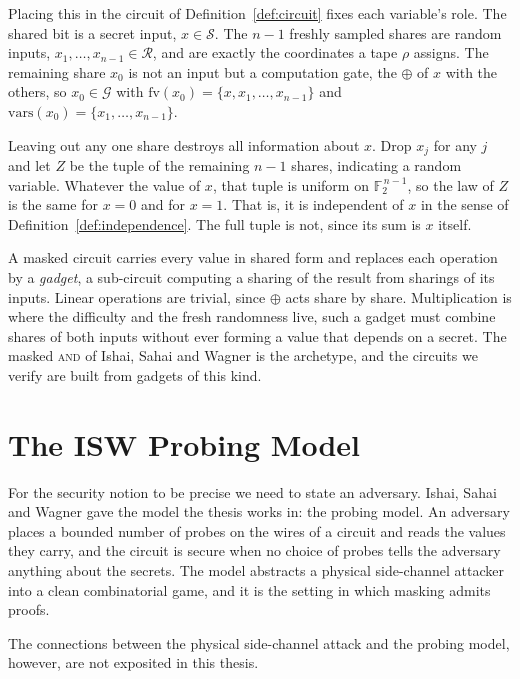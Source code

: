   Placing this in the circuit of Definition~\ref{def:circuit} fixes each variable's
  role. The shared bit is a secret input, $x \in \mathcal{S}$. The $n-1$ freshly
  sampled shares are random inputs, $x_1, \dots, x_{n-1} \in \mathcal{R}$, and are
  exactly the coordinates a tape $\rho$ assigns. The remaining share $x_0$ is not
  an input but a computation gate, the $\oplus$ of $x$ with the others, so
  $x_0 \in \mathcal{G}$ with $\mathrm{fv}(x_0) = \{x, x_1, \dots, x_{n-1}\}$ and
  $\mathrm{vars}(x_0) = \{x_1, \dots, x_{n-1}\}$.

  Leaving out any one share destroys all information about $x$. Drop $x_j$ for any
  $j$ and let $Z$ be the tuple of the remaining $n-1$ shares, indicating a random variable.
  Whatever the value of
  $x$, that tuple is uniform on $\mathbb{F}_2^{\,n-1}$, so the law of $Z$ is the
  same for $x = 0$ and for $x = 1$. That is, it is independent of $x$ in the sense of
  Definition~\ref{def:independence}. The full tuple is not, since its sum is
  $x$ itself.

  A masked circuit carries every value in shared form and replaces each operation
  by a \emph{gadget}, a sub-circuit computing a sharing of the result from sharings
  of its inputs. Linear operations are trivial, since $\oplus$ acts share by share.
  Multiplication is where the difficulty and the fresh randomness live, such a gadget
  must combine shares of both inputs without ever forming a value that
  depends on a secret. The masked \textsc{and} of Ishai, Sahai and Wagner
  \parencite{10.1007/978-3-540-45146-4_27} is the archetype, and the circuits we
  verify are built from gadgets of this kind.

\section{The ISW Probing Model}
\label{sec:isw-model}

For the security notion to be precise we need to state an adversary. Ishai, Sahai and Wagner
\parencite{10.1007/978-3-540-45146-4_27} gave the model the thesis works in: the
probing model. An adversary places a bounded number of probes on the wires
of a circuit and reads the values they carry, and the circuit is secure when no
choice of probes tells the adversary anything about the secrets. The model
abstracts a physical side-channel attacker into a clean combinatorial game, and it
is the setting in which masking admits proofs.

The connections between the physical side-channel attack and the probing model, however,
are not exposited in this thesis.


